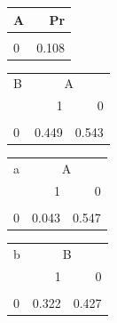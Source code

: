 \documentclass[
  10pt,
  dvipsnames,enabledeprecatedfontcommands]{scrartcl}
\begin{document}
\begin{figure}
\begin{subfigure}[!ht]{0.45\textwidth}

\footnotesize 
\begin{tabular}{lr}
\toprule
A & Pr\\
\midrule
\cellcolor{gray!6}{1} & \cellcolor{gray!6}{0.892}\\
0 & 0.108\\
\bottomrule
\end{tabular}

\vspace{2mm}

\begin{tabular}{lrr}
\toprule
\multicolumn{1}{c}{B} & \multicolumn{2}{c}{A} \\
  & 1 & 0\\
\midrule
\cellcolor{gray!6}{1} & \cellcolor{gray!6}{0.551} & \cellcolor{gray!6}{0.457}\\
0 & 0.449 & 0.543\\
\bottomrule
\end{tabular}

\vspace{2mm}

\begin{tabular}{lrr}
\toprule
\multicolumn{1}{c}{a} & \multicolumn{2}{c}{A} \\
  & 1 & 0\\
\midrule
\cellcolor{gray!6}{1} & \cellcolor{gray!6}{0.957} & \cellcolor{gray!6}{0.453}\\
0 & 0.043 & 0.547\\
\bottomrule
\end{tabular}


\vspace{2mm}

\begin{tabular}{lrr}
\toprule
\multicolumn{1}{c}{b} & \multicolumn{2}{c}{B} \\
  & 1 & 0\\
\midrule
\cellcolor{gray!6}{1} & \cellcolor{gray!6}{0.678} & \cellcolor{gray!6}{0.573}\\
0 & 0.322 & 0.427\\
\bottomrule
\end{tabular}

\vspace{2mm}

\normalsize
\end{subfigure} \begin{subfigure}[!ht]{0.45\textwidth}


\end{subfigure}
\end{figure}
\end{document}
